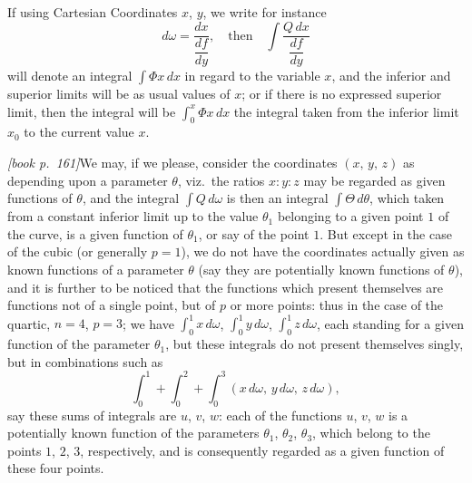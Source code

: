 \documentclass[11pt,a4paper]{article}
\begin{document}
If using Cartesian Coordinates $x$, $y$, we write for instance
\[
d\omega = \frac{dx}{\dfrac{df}{dy}},\quad\text{then}\quad \int\frac{Q\,dx}{\dfrac{df}{dy}}
\]
will denote an integral $\displaystyle\int\Phi x\,dx$ in regard to the variable $x$, and the inferior and superior limits will be as usual values of $x$; or if there is no expressed superior limit, then the integral will be $\displaystyle\int_0^x \Phi x\,dx$ the integral taken from the inferior limit $x_0$ to the current value $x$.

\medskip\noindent\textit{[book p.~161]}\quad We may, if we please, consider the coordinates $(x,\,y,\,z)$ as depending upon a parameter $\theta$, viz.\ the ratios $x : y : z$ may be regarded as given functions of $\theta$, and the integral $\int Q\,d\omega$ is then an integral $\int\Theta\,d\theta$, which taken from a constant inferior limit up to the value $\theta_1$ belonging to a given point $1$ of the curve, is a given function of $\theta_1$, or say of the point $1$. But except in the case of the cubic (or generally $p = 1$), we do not have the coordinates actually given as known functions of a parameter $\theta$ (say they are potentially known functions of $\theta$), and it is further to be noticed that the functions which present themselves are functions not of a single point, but of $p$ or more points: thus in the case of the quartic, $n = 4$, $p = 3$; we have $\int_0^1 x\,d\omega$, $\int_0^1 y\,d\omega$, $\int_0^1 z\,d\omega$, each standing for a given function of the parameter $\theta_1$, but these integrals do not present themselves singly, but in combinations such as
\[
\int_0^1 + \int_0^2 + \int_0^3 (x\,d\omega,\,y\,d\omega,\,z\,d\omega),
\]
say these sums of integrals are $u$, $v$, $w$: each of the functions $u$, $v$, $w$ is a potentially known function of the parameters $\theta_1$, $\theta_2$, $\theta_3$, which belong to the points $1$, $2$, $3$, respectively, and is consequently regarded as a given function of these four points.
\end{document}
